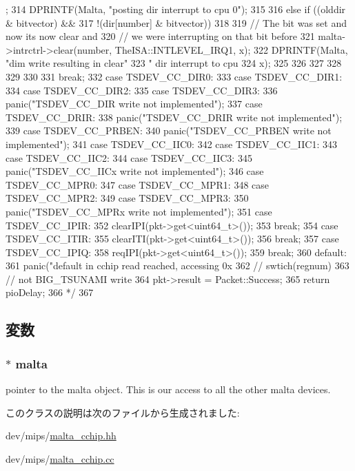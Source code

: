 \begin{DoxyCode}
{{{{{{      ;
314                           DPRINTF(Malta, "posting dir interrupt to cpu 0\n");
315                         }
316                         else if ((olddir & bitvector) &&
317                                 !(dir[number] & bitvector))
318                         {
319                             // The bit was set and now its now clear and
320                             // we were interrupting on that bit before
321                             malta->intrctrl->clear(number, TheISA::INTLEVEL_IRQ1,
       x);
322                           DPRINTF(Malta, "dim write resulting in clear"
323                                     " dir interrupt to cpu %
324                                     x);
325 
326                         }
327 
328 
329                     }
330                 }
331                 break;
332             case TSDEV_CC_DIR0:
333             case TSDEV_CC_DIR1:
334             case TSDEV_CC_DIR2:
335             case TSDEV_CC_DIR3:
336                 panic("TSDEV_CC_DIR write not implemented\n");
337             case TSDEV_CC_DRIR:
338                 panic("TSDEV_CC_DRIR write not implemented\n");
339             case TSDEV_CC_PRBEN:
340                 panic("TSDEV_CC_PRBEN write not implemented\n");
341             case TSDEV_CC_IIC0:
342             case TSDEV_CC_IIC1:
343             case TSDEV_CC_IIC2:
344             case TSDEV_CC_IIC3:
345                 panic("TSDEV_CC_IICx write not implemented\n");
346             case TSDEV_CC_MPR0:
347             case TSDEV_CC_MPR1:
348             case TSDEV_CC_MPR2:
349             case TSDEV_CC_MPR3:
350                 panic("TSDEV_CC_MPRx write not implemented\n");
351             case TSDEV_CC_IPIR:
352                 clearIPI(pkt->get<uint64_t>());
353                 break;
354             case TSDEV_CC_ITIR:
355                 clearITI(pkt->get<uint64_t>());
356                 break;
357             case TSDEV_CC_IPIQ:
358                 reqIPI(pkt->get<uint64_t>());
359                 break;
360             default:
361               panic("default in cchip read reached, accessing 0x%
362         }  // swtich(regnum)
363     } // not BIG_TSUNAMI write
364     pkt->result = Packet::Success;
365     return pioDelay;
366     */
367 }
\end{DoxyCode}


\subsection{変数}
\hypertarget{classMaltaCChip_ae7ba1afe6be03355de9c5cbc41c11f96}{
\subsubsection[{malta}]{$\ast$ {\bf malta}}}
\label{classMaltaCChip_ae7ba1afe6be03355de9c5cbc41c11f96}
pointer to the malta object. This is our access to all the other malta devices. 

このクラスの説明は次のファイルから生成されました:\begin{DoxyCompactItemize}
\item 
dev/mips/\hyperlink{malta__cchip_8hh}{malta\_\-cchip.hh}\item 
dev/mips/\hyperlink{malta__cchip_8cc}{malta\_\-cchip.cc}\end{DoxyCompactItemize}
